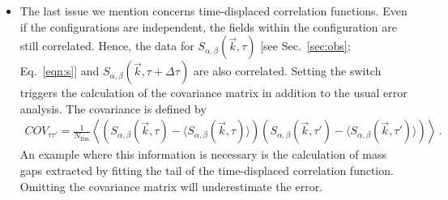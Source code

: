 \begin{itemize}
	\item The last issue we mention concerns time-displaced correlation functions. Even if the configurations are independent, the fields within the configuration are still correlated. Hence, the data for $S_{\alpha,\beta}(\vec{k},\tau)$ [see Sec.~\ref{sec:obs}; Eq.~\eqref{eqn:s}] and $S_{\alpha,\beta}(\vec{k},\tau+\Delta\tau)$ are also correlated. Setting the switch  triggers the calculation of the covariance matrix in addition to the usual error analysis. The covariance is defined by
	\begin{align}
		COV_{\tau\tau'}=\frac{1}{N_{\text{Bin}}}\left\langle
		\left( S_{\alpha,\beta}(\vec{k},\tau) - \big\langle S_{\alpha,\beta}(\vec{k},\tau)\big\rangle \right)
		\left(S_{\alpha,\beta}(\vec{k},\tau')-\big\langle S_{\alpha,\beta}(\vec{k},\tau')\big\rangle \right)  \right\rangle\,.
	\end{align}
An example where this information is necessary is the  calculation of mass gaps extracted by fitting the  tail  of the time-displaced correlation function.  Omitting  the covariance matrix will  underestimate the  error.
\end{itemize}


%
